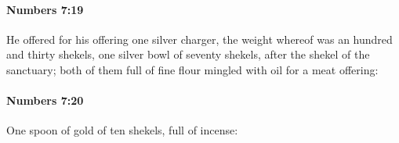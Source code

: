 		\paragraph{Numbers 7:19} %
			\label{NUMBERS-7-19}

			He offered for his offering one silver charger, the weight whereof was an hundred and thirty shekels, one silver bowl of seventy shekels, after the shekel of the sanctuary; both of them full of fine flour mingled with oil for a meat offering:


		\paragraph{Numbers 7:20} %
			\label{NUMBERS-7-20}

			One spoon of gold of ten shekels, full of incense:


